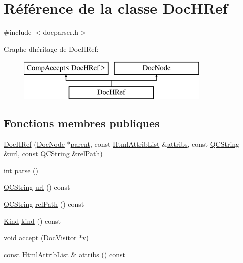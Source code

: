 \hypertarget{class_doc_h_ref}{}\section{Référence de la classe Doc\+H\+Ref}
\label{class_doc_h_ref}


{\ttfamily \#include $<$docparser.\+h$>$}

Graphe d\textquotesingle{}héritage de Doc\+H\+Ref\+:\begin{figure}[H]
\begin{center}
\leavevmode
\includegraphics[height=2.000000cm]{class_doc_h_ref}
\end{center}
\end{figure}
\subsection*{Fonctions membres publiques}
\begin{DoxyCompactItemize}
\item 
\hyperlink{class_doc_h_ref_a0817d8cdaaa3d691fc5b55f24db0798d}{Doc\+H\+Ref} (\hyperlink{class_doc_node}{Doc\+Node} $\ast$\hyperlink{class_doc_node_a990d8b983962776a647e6231d38bd329}{parent}, const \hyperlink{class_html_attrib_list}{Html\+Attrib\+List} \&\hyperlink{class_doc_h_ref_a13da3a127201418418fb35a83c0f350b}{attribs}, const \hyperlink{class_q_c_string}{Q\+C\+String} \&\hyperlink{class_doc_h_ref_a9660fdba87b8da45e942dde2aa77744f}{url}, const \hyperlink{class_q_c_string}{Q\+C\+String} \&\hyperlink{class_doc_h_ref_abe1f7ed14055a866708eac6c7367a115}{rel\+Path})
\item 
int \hyperlink{class_doc_h_ref_a07934cfcbc2cfb3709b90915cf087135}{parse} ()
\item 
\hyperlink{class_q_c_string}{Q\+C\+String} \hyperlink{class_doc_h_ref_a9660fdba87b8da45e942dde2aa77744f}{url} () const 
\item 
\hyperlink{class_q_c_string}{Q\+C\+String} \hyperlink{class_doc_h_ref_abe1f7ed14055a866708eac6c7367a115}{rel\+Path} () const 
\item 
\hyperlink{class_doc_node_aebd16e89ca590d84cbd40543ea5faadb}{Kind} \hyperlink{class_doc_h_ref_a0ec431176b2cd13882d80d5bbcec8837}{kind} () const 
\item 
void \hyperlink{class_doc_h_ref_a2d706b25d10a510cbe3600a843f87c3f}{accept} (\hyperlink{class_doc_visitor}{Doc\+Visitor} $\ast$v)
\item 
const \hyperlink{class_html_attrib_list}{Html\+Attrib\+List} \& \hyperlink{class_doc_h_ref_a13da3a127201418418fb35a83c0f350b}{attribs} () const 
\end{DoxyCompactItemize}
